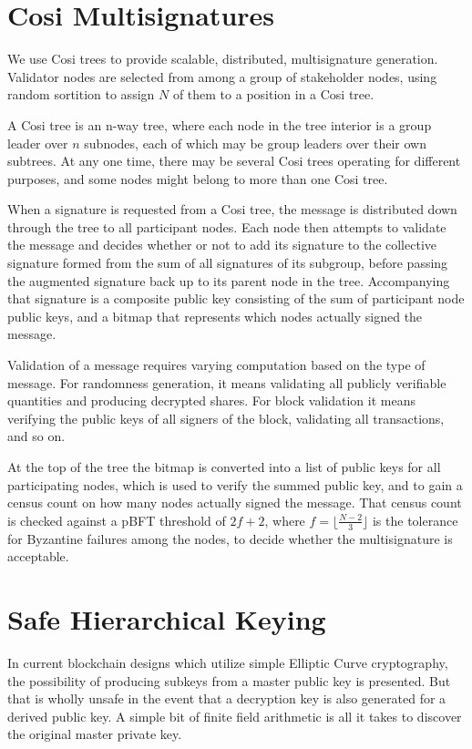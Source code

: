\documentclass[article,oneside]{memoir}
\begin{document}
\chapter{Cosi Multisignatures}
We use Cosi trees\cite{cosi} to provide scalable, distributed, multisignature generation. Validator nodes are selected from among a group of stakeholder nodes, using random sortition to assign $N$ of them to a position in a Cosi tree. 

A Cosi tree is an n-way tree, where each node in the tree interior is a group leader over $n$ subnodes, each of which may be group leaders over their own subtrees. At any one time, there may be several Cosi trees operating for different purposes, and some nodes might belong to more than one Cosi tree.

When a signature is requested from a Cosi tree, the message is distributed down through the tree to all participant nodes. Each node then attempts to validate the message and decides whether or not to add its signature to the collective signature formed from the sum of all signatures of its subgroup, before passing the augmented signature back up to its parent node in the tree. Accompanying that signature is a composite public key consisting of the sum of participant node public keys, and a bitmap that represents which nodes actually signed the message.

Validation of a message requires varying computation based on the type of message. For randomness generation, it means validating all publicly verifiable quantities and producing decrypted shares. For block validation it means verifying the public keys of all signers of the block, validating all transactions, and so on.

At the top of the tree the bitmap is converted into a list of public keys for all participating nodes, which is used to verify the summed public key, and to gain a census count on how many nodes actually signed the message. That census count is checked against a pBFT threshold of $2 f+ 2$, where $f = \lfloor \frac{N-2}{3} \rfloor$ is the tolerance for Byzantine failures among the nodes, to decide whether the multisignature is acceptable. 

\chapter{Safe Hierarchical Keying}

In current blockchain designs which utilize simple Elliptic Curve cryptography, the possibility of producing subkeys from a master public key is presented. But that is wholly unsafe in the event that a decryption key is also generated for a derived public key. A simple bit of finite field arithmetic is all it takes to discover the original master private key.
\end{document}
